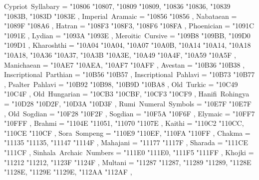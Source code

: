 {    Cypriot~Syllabary                              = { {"10806} {"10807}, {"10809} {"10809}, {"10836} {"10836}, {"10839} {"1083B}, {"1083D} {"1083E} },
    Imperial~Aramaic                               = { {"10856} {"10856} },
    Nabataean                                      = { {"1089F} {"108A6} },
    Hatran                                         = { {"108F3} {"108F3}, {"108F6} {"108FA} },
    Phoenician                                     = { {"1091C} {"1091E} },
    Lydian                                         = { {"1093A} {"1093E} },
    Meroitic~Cursive                               = { {"109B8} {"109BB}, {"109D0} {"109D1} },
    Kharoshthi                                     = { {"10A04} {"10A04}, {"10A07} {"10A0B}, {"10A14} {"10A14}, {"10A18} {"10A18}, {"10A36} {"10A37}, {"10A3B} {"10A3E}, {"10A49} {"10A4F}, {"10A59} {"10A5F} },
    Manichaean                                     = { {"10AE7} {"10AEA}, {"10AF7} {"10AFF} },
    Avestan                                        = { {"10B36} {"10B38} },
    Inscriptional~Parthian                         = { {"10B56} {"10B57} },
    Inscriptional~Pahlavi                          = { {"10B73} {"10B77} },
    Psalter~Pahlavi                                = { {"10B92} {"10B98}, {"10B9D} {"10BA8} },
    Old~Turkic                                     = { {"10C49} {"10C4F} },
    Old~Hungarian                                  = { {"10CB3} {"10CBF}, {"10CF3} {"10CF9} },
    Hanifi~Rohingya                                = { {"10D28} {"10D2F}, {"10D3A} {"10D3F} },
    Rumi~Numeral~Symbols                           = { {"10E7F} {"10E7F} },
    Old~Sogdian                                    = { {"10F28} {"10F2F} },
    Sogdian                                        = { {"10F5A} {"10F6F} },
    Elymaic                                        = { {"10FF7} {"10FFF} },
    Brahmi                                         = { {"1104E} {"11051}, {"11070} {"1107E} },
    Kaithi                                         = { {"110C2} {"110CC}, {"110CE} {"110CF} },
    Sora~Sompeng                                   = { {"110E9} {"110EF}, {"110FA} {"110FF} },
    Chakma                                         = { {"11135} {"11135}, {"11147} {"1114F} },
    Mahajani                                       = { {"11177} {"1117F} },
    Sharada                                        = { {"111CE} {"111CF} },
    Sinhala~Archaic~Numbers                        = { {"111E0} {"111E0}, {"111F5} {"111FF} },
    Khojki                                         = { {"11212} {"11212}, {"1123F} {"1124F} },
    Multani                                        = { {"11287} {"11287}, {"11289} {"11289}, {"1128E} {"1128E}, {"1129E} {"1129E}, {"112AA} {"112AF} },
}
